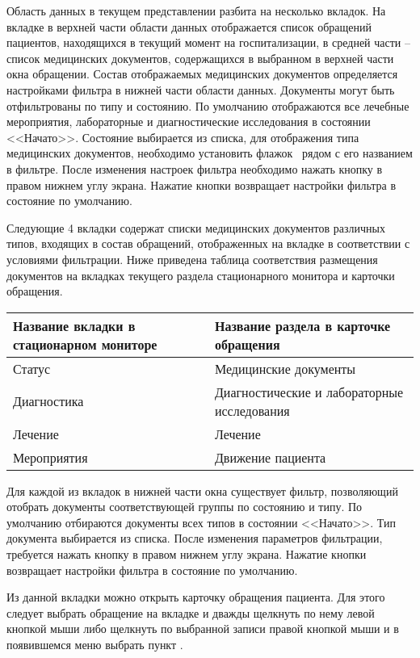 Область данных в текущем представлении разбита на несколько вкладок. На вкладке  в верхней части области данных отображается список обращений пациентов, находящихся в текущий момент на госпитализации, в средней части – список медицинских документов, содержащихся в выбранном в верхней части окна обращении. Состав отображаемых медицинских документов определяется настройками фильтра в нижней части области данных. Документы могут быть отфильтрованы по типу и состоянию. По умолчанию отображаются все лечебные мероприятия, лабораторные и диагностические исследования  в состоянии <<Начато>>. Состояние выбирается из списка, для отображения типа медицинских документов, необходимо установить флажок \putx~рядом с его названием в фильтре. После изменения настроек фильтра необходимо нажать кнопку  в правом нижнем углу экрана. Нажатие кнопки  возвращает настройки фильтра в состояние по умолчанию.

Следующие 4 вкладки содержат списки медицинских документов различных типов, входящих в состав обращений, отображенных на вкладке  в соответствии с условиями фильтрации. Ниже приведена таблица соответствия размещения документов на вкладках текущего раздела стационарного монитора и карточки обращения.

{\small
\begin{tabular}{|p{7cm}|p{8.5cm}|}
\hline
\textbf{Название вкладки в стационарном мониторе} & \textbf{Название раздела в карточке обращения} \\
\hline
Статус & Медицинские документы \\
\hline
Диагностика &	Диагностические и лабораторные исследования \\
\hline
Лечение & Лечение \\
\hline
Мероприятия &	Движение пациента \\
\hline
\end{tabular}
}
\vspace*{0.5em}

Для каждой из вкладок в нижней части окна существует фильтр, позволяющий отобрать документы соответствующей группы по состоянию и типу. По умолчанию отбираются документы всех типов в состоянии <<Начато>>. Тип документа выбирается из списка. После изменения параметров фильтрации, требуется нажать кнопку  в правом нижнем углу экрана. Нажатие кнопки   возвращает настройки фильтра в состояние по умолчанию.

Из данной вкладки можно открыть карточку обращения пациента. Для этого следует выбрать обращение на вкладке  и дважды щелкнуть по нему левой кнопкой мыши либо щелкнуть по выбранной записи правой кнопкой мыши и в появившемся меню выбрать пункт .

